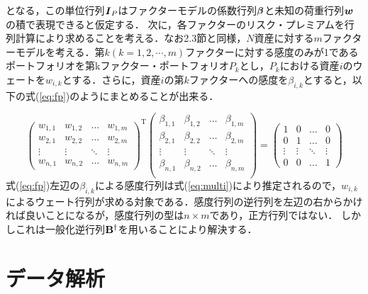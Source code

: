 \documentclass[11pt]{jreport}
\begin{document}
となる，この単位行列$\mbox{\boldmath $I$}_P$はファクターモデルの係数行列$\mbox{\boldmath $\beta$}$と未知の荷重行列$\mbox{\boldmath $w$}$の積で表現できると仮定する．
次に，各ファクターのリスク・プレミアムを行列計算により求めることを考える．なお2.3節と同様，$N$資産に対する$m$ファクターモデルを考える．第$k(k=1,2,\cdots,m)$ファクターに対する感度のみが1であるポートフォリオを第kファクター・ポートフォリオ$P_k$とし，$P_k$における資産$i$のウェートを$w_{i,k}$とする．さらに，資産$i$の第$k$ファクターへの感度を$\beta_{i,k}$とすると，以下の式(\ref{eq:fp})のようにまとめることが出来る．



\begin{equation}
\left(
	\begin{array}{cccc}
	w_{1,1} & w_{1,2} & \ldots & w_{1,m}\\
	w_{2,1} & w_{2,2} & \ldots & w_{2,m}\\
	\vdots & \vdots & \ddots & \vdots\\
	w_{n,1} & w_{n,2} & \ldots & w_{n,m}
	\end{array}
\right)^{\mathrm{T}}
\left(
	\begin{array}{cccc}
	\beta_{1,1} & \beta_{1,2} & \ldots & \beta_{1,m}\\
	\beta_{2,1} & \beta_{2,2} & \ldots & \beta_{2,m}\\
	\vdots & \vdots & \ddots & \vdots\\
	\beta_{n,1} & \beta_{n,2} & \ldots & \beta_{n,m}\\
	\end{array}
\right)=
\left(
	\begin{array}{cccc}
	1 & 0 & \ldots & 0\\
	0 & 1 & \ldots & 0\\
	\vdots & \vdots & \ddots & \vdots \\
	0 & 0 & \ldots & 1
	\end{array}
\right)
\label{eq:fp}
\end{equation}
式(\ref{eq:fp})左辺の$\beta_{i,k}$による感度行列は式(\ref{eq:multi})により推定されるので，$w_{i,k}$によるウェート行列が求める対象である．感度行列の逆行列を左辺の右からかければ良いことになるが，感度行列の型は$n\times m$であり，正方行列ではない．
しかしこれは一般化逆行列$\bf{B}^\dag$を用いることにより解決する．







\chapter{データ解析}
\end{document}
